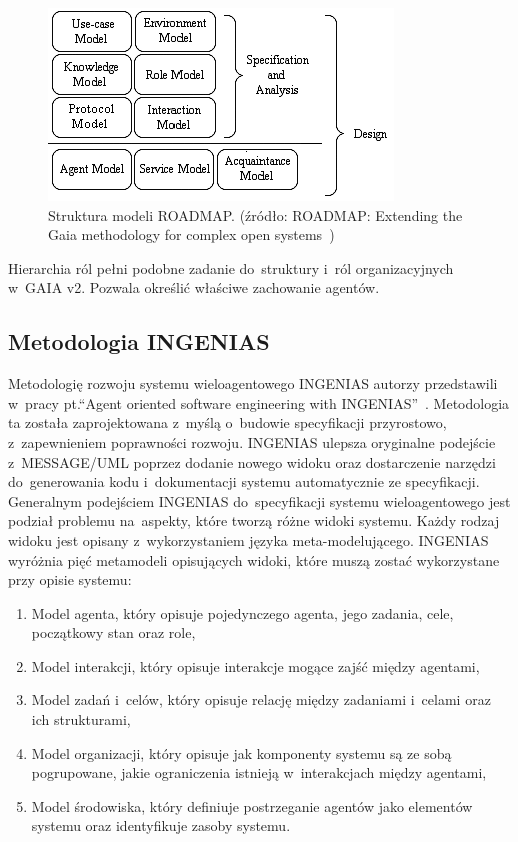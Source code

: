 \documentclass[11pt]{report}
\begin{document}
    \begin{figure}[!ht]
        \centering
        \includegraphics[width=\linewidth]{fig/roadmap models.png}
        \caption{Struktura modeli ROADMAP. (źródło: ROADMAP: Extending the Gaia methodology for complex open systems~\cite{Juan2002a})}
        \label{fig:roadmap}
    \end{figure}

    Hierarchia ról pełni podobne zadanie do~struktury i~ról organizacyjnych w~GAIA v2.
    Pozwala określić właściwe zachowanie agentów.

    \subsection{Metodologia INGENIAS}
    Metodologię rozwoju systemu wieloagentowego INGENIAS autorzy przedstawili w~pracy pt.\@ ``Agent oriented software engineering with INGENIAS''~\cite{Pavon2003}.
    Metodologia ta została zaprojektowana z~myślą o~budowie specyfikacji przyrostowo, z~zapewnieniem poprawności rozwoju.
    INGENIAS ulepsza oryginalne podejście z~MESSAGE/UML poprzez dodanie nowego widoku oraz dostarczenie narzędzi do~generowania kodu i~dokumentacji systemu automatycznie ze specyfikacji.
    Generalnym podejściem INGENIAS do~specyfikacji systemu wieloagentowego jest podział problemu na~aspekty, które tworzą różne widoki systemu.
    Każdy rodzaj widoku jest opisany z~wykorzystaniem języka meta-modelującego.
    INGENIAS wyróżnia pięć metamodeli opisujących widoki, które muszą zostać wykorzystane przy opisie systemu:
    \begin{enumerate}
        \item Model agenta, który opisuje pojedynczego agenta, jego zadania, cele, początkowy stan oraz role,
        \item Model interakcji, który opisuje interakcje mogące zajść między agentami,
        \item Model zadań i~celów, który opisuje relację między zadaniami i~celami oraz ich strukturami,
        \item Model organizacji, który opisuje jak komponenty systemu są ze sobą pogrupowane, jakie ograniczenia istnieją w~interakcjach między agentami,
        \item Model środowiska, który definiuje postrzeganie agentów jako elementów systemu oraz identyfikuje zasoby systemu.
    \end{enumerate}
\end{document}
